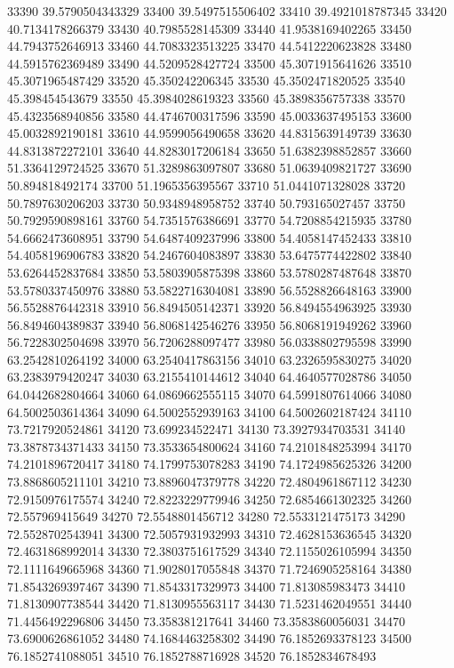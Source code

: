 {33390 39.5790504343329
33400 39.5497515506402
33410 39.4921018787345
33420 40.7134178266379
33430 40.7985528145309
33440 41.9538169402265
33450 44.7943752646913
33460 44.7083323513225
33470 44.5412220623828
33480 44.5915762369489
33490 44.5209528427724
33500 45.3071915641626
33510 45.3071965487429
33520 45.350242206345
33530 45.3502471820525
33540 45.398454543679
33550 45.3984028619323
33560 45.3898356757338
33570 45.4323568940856
33580 44.4746700317596
33590 45.0033637495153
33600 45.0032892190181
33610 44.9599056490658
33620 44.8315639149739
33630 44.8313872272101
33640 44.8283017206184
33650 51.6382398852857
33660 51.3364129724525
33670 51.3289863097807
33680 51.0639409821727
33690 50.894818492174
33700 51.1965356395567
33710 51.0441071328028
33720 50.7897630206203
33730 50.9348948958752
33740 50.793165027457
33750 50.7929590898161
33760 54.7351576386691
33770 54.7208854215935
33780 54.6662473608951
33790 54.6487409237996
33800 54.4058147452433
33810 54.4058196906783
33820 54.2467604083897
33830 53.6475774422802
33840 53.6264452837684
33850 53.5803905875398
33860 53.5780287487648
33870 53.5780337450976
33880 53.5822716304081
33890 56.5528826648163
33900 56.5528876442318
33910 56.8494505142371
33920 56.8494554963925
33930 56.8494604389837
33940 56.8068142546276
33950 56.8068191949262
33960 56.7228302504698
33970 56.7206288097477
33980 56.0338802795598
33990 63.2542810264192
34000 63.2540417863156
34010 63.2326595830275
34020 63.2383979420247
34030 63.2155410144612
34040 64.4640577028786
34050 64.0442682804664
34060 64.0869662555115
34070 64.5991807614066
34080 64.5002503614364
34090 64.5002552939163
34100 64.5002602187424
34110 73.7217920524861
34120 73.699234522471
34130 73.3927934703531
34140 73.3878734371433
34150 73.3533654800624
34160 74.2101848253994
34170 74.2101896720417
34180 74.1799753078283
34190 74.1724985625326
34200 73.8868605211101
34210 73.8896047379778
34220 72.4804961867112
34230 72.9150976175574
34240 72.8223229779946
34250 72.6854661302325
34260 72.557969415649
34270 72.5548801456712
34280 72.5533121475173
34290 72.5528702543941
34300 72.5057931932993
34310 72.4628153636545
34320 72.4631868992014
34330 72.3803751617529
34340 72.1155026105994
34350 72.1111649665968
34360 71.9028017055848
34370 71.7246905258164
34380 71.8543269397467
34390 71.8543317329973
34400 71.813085983473
34410 71.8130907738544
34420 71.8130955563117
34430 71.5231462049551
34440 71.4456492296806
34450 73.358381217641
34460 73.3583860056031
34470 73.6900626861052
34480 74.1684463258302
34490 76.1852693378123
34500 76.1852741088051
34510 76.1852788716928
34520 76.1852834678493
}
